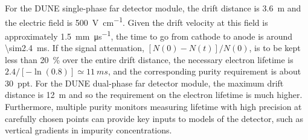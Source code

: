 %
%
%

For the DUNE single-phase far detector module, the drift distance is \SI{3.6}{\meter} and the electric field is \SI{500}{\volt\per\centi\meter}. Given the drift velocity at this field is approximately \SI{1.5}{\milli\meter\per\micro\second}, the time to go from cathode to anode is around \SI{\sim2.4}{\milli\second}\cite{Walkowiak:2000wf}.
If the   signal attenuation, \([N(0)-N(t)]/N(0)\), is to be kept less than \SI{20}{\percent} over the entire drift distance, the necessary electron lifetime is $2.4/[-\ln(0.8)] \simeq \SI{11}{ms}$, and the corresponding  purity requirement is about \SI{30}{ppt}. For the DUNE dual-phase far detector module, the maximum drift distance is \SI{12}{\meter} and so the requirement on the electron lifetime is much higher.
Furthermore, multiple purity monitors measuring lifetime with high precision at carefully chosen points can provide key inputs to  models of the detector, such as vertical gradients in impurity concentrations.

